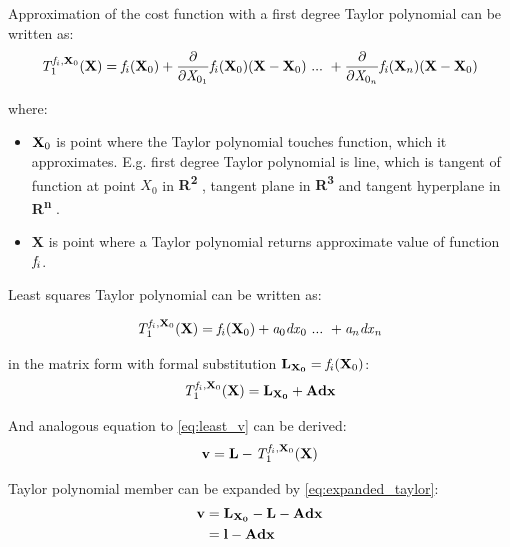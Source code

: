 \documentclass[a4paper,12pt]{article}
\newcommand{\ematr}[1]{
{\bf #1}
}
\newcommand{\evect}[1]{
{\bf #1}
}
\newcommand{\escal}[1]{
{\it #1}
}
\newcommand{\eucl}[1]{
{\bf R\textsuperscript{#1}}
}
\newcommand{\efunc}[1]{
{\it #1}
}
\begin{document}
Approximation of the cost function with a first degree Taylor polynomial can be written as:
\begin{equation}
\efunc{T} ^{\efunc{f}_{i}, \evect{X}_{0}}_{1} (\evect{X}) = 
	      \efunc{f}_{i}(\evect{X}_{0}) + 
               \frac{\partial}{\partial {\escal{X}_{0_{1}}}} \efunc{f}_{i} (\evect{X}_{0}) (\evect{X} -  \evect{X}_{0}) 
\ ... \ + \frac{\partial}{\partial {\escal{X}_{0_{n}}}} \efunc{f_{i}}(\evect{X}_{n}) (\evect{X} - \evect{X}_{0}) 
\end{equation}



where:
\begin{itemize}
\item $\evect{X}_{0}$ is point where the Taylor polynomial touches function, which it approximates. E.g. first degree Taylor polynomial 
      is line, which is tangent of function at point $X_{0}$ in \eucl{2}, tangent plane in \eucl{3} and  
      tangent hyperplane in  \eucl{n}.
\item \evect{X} is point where a Taylor polynomial returns approximate value of function $\efunc{f}_{i}$.
\end{itemize}

Least squares Taylor polynomial can be written as:

\begin{equation}
\efunc{T} ^{\efunc{f}_{i}, \evect{X}_{0}}_{1} (\evect{X}) =  \efunc{f}_{i}(\evect{X}_{0}) + \escal{a}_{0} \escal{dx}_{0} \ ... \ + \escal{a}_{n} \escal{dx}_{n} 
\end{equation} 

in the matrix form with formal substitution $\evect{L_{X_{0}}} = \efunc{f}_{i}(\evect{X}_{0})$:
\begin{equation}
\label{eq:expanded_taylor}
\efunc{T} ^{\efunc{f}_{i}, \evect{X}_{0}}_{1} (\evect{X}) = \evect{L_{X_{0}}} + \ematr{A}\evect{dx}
\end{equation} 

And analogous equation to \eqref{eq:least_v} can be derived:
\begin{equation}
\evect{v} = \evect{L} - \efunc{T} ^{\efunc{f}_{i}, \evect{X}_{0}}_{1} (\evect{X})
\end{equation} 
 
Taylor polynomial member can be expanded by \eqref{eq:expanded_taylor}:
\begin{equation}
\begin{split}
\evect{v} &=  \evect{L_{X_{0}}} - \evect{L} - \ematr{A}\evect{dx} \\
          &= \evect{l} - \ematr{A}\evect{dx}
\end{split}
\end{equation}
\end{document}

